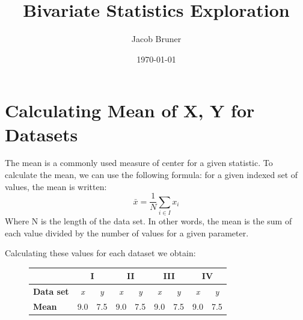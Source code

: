 \documentclass[11pt,a4paper]{article}
\author{Jacob Bruner}
\title{Bivariate Statistics Exploration}
\date{\today}
\begin{document}
\maketitle

\section{Calculating Mean of X, Y for Datasets}
The mean is a commonly used measure of center for a given statistic. To calculate the mean, we can use the following formula: for a given indexed set of values, the mean is written:
\[
\bar{x} = \frac{1}{N} \sum_{i \in I} x_i
\]
Where N is the length of the data set. In other words, the mean is the sum of each value divided by the number of values for a given parameter.

Calculating these values for each dataset we obtain:

\begin{figure}[ht]
\centering
\begin{tabular}{|l|cc|cc|cc|cc|}
\hline
\textbf{}         & \multicolumn{2}{c|}{\textbf{I}}              & \multicolumn{2}{c|}{\textbf{II}}             & \multicolumn{2}{c|}{\textbf{III}}            & \multicolumn{2}{c|}{\textbf{IV}}             \\ \hline
\textbf{Data set} & \multicolumn{1}{c|}{\textit{x}} & \textit{y} & \multicolumn{1}{c|}{\textit{x}} & \textit{y} & \multicolumn{1}{c|}{\textit{x}} & \textit{y} & \multicolumn{1}{c|}{\textit{x}} & \textit{y} \\ \hline
\textbf{Mean}     & \multicolumn{1}{c|}{9.0}        & 7.5        & \multicolumn{1}{c|}{9.0}        & 7.5        & \multicolumn{1}{c|}{9.0}        & 7.5        & \multicolumn{1}{c|}{9.0}        & 7.5        \\ \hline
\end{tabular}
\end{figure}
\end{document}
